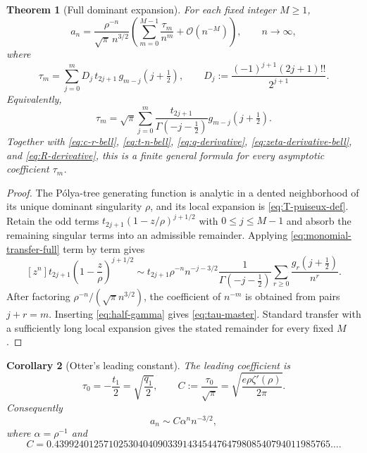 \documentclass[11pt,oneside]{article}
\numberwithin{equation}{section}
\theoremstyle{plain}
\newtheorem{theorem}{Theorem}[section]
\newtheorem{corollary}[theorem]{Corollary}
\theoremstyle{definition}
\theoremstyle{remark}
\newcommand{\Ord}{\mathcal O}
\begin{document}
\begin{theorem}[Full dominant expansion]\label{thm:dominant-expansion}
For each fixed integer $M\ge1$,
\begin{equation}\label{eq:dominant-expansion-M}
 a_n=\frac{\rho^{-n}}{\sqrt\pi\,n^{3/2}}
 \left(\sum_{m=0}^{M-1}\frac{\tau_m}{n^m}
       +\Ord(n^{-M})\right),\qquad n\to\infty,
\end{equation}
where
\begin{equation}\label{eq:tau-master}
 \boxed{
 \tau_m=\sum_{j=0}^{m}
 D_j\,t_{2j+1}\,g_{m-j}\!\left(j+\tfrac12\right),
 \qquad
 D_j:=\frac{(-1)^{j+1}(2j+1)!!}{2^{j+1}}.}
\end{equation}
Equivalently,
\begin{equation}\label{eq:tau-master-gamma}
 \tau_m=\sqrt\pi\sum_{j=0}^{m}
 \frac{t_{2j+1}}{\Gamma(-j-\tfrac12)}
 g_{m-j}\!\left(j+\tfrac12\right).
\end{equation}
Together with \eqref{eq:c-r-bell}, \eqref{eq:t-n-bell},
\eqref{eq:q-derivative}, \eqref{eq:zeta-derivative-bell}, and
\eqref{eq:R-derivative}, this is a finite general formula for every
asymptotic coefficient $\tau_m$.
\end{theorem}

\begin{proof}
The P\'olya-tree generating function is analytic in a dented neighborhood
of its unique dominant singularity $\rho$, and its local expansion is
\eqref{eq:T-puiseux-def}.  Retain the odd terms
$t_{2j+1}(1-z/\rho)^{j+1/2}$ with $0\le j\le M-1$ and absorb the remaining
singular terms into an admissible remainder.  Applying
\eqref{eq:monomial-transfer-full} term by term gives
\[
 [z^n]t_{2j+1}\left(1-\frac z\rho\right)^{j+1/2}
 \sim t_{2j+1}\rho^{-n}n^{-j-3/2}
 \frac1{\Gamma(-j-\tfrac12)}
 \sum_{r\ge0}\frac{g_r(j+\tfrac12)}{n^r}.
\]
After factoring $\rho^{-n}/(\sqrt\pi n^{3/2})$, the coefficient of $n^{-m}$
is obtained from pairs $j+r=m$.  Inserting \eqref{eq:half-gamma} gives
\eqref{eq:tau-master}.  Standard transfer with a sufficiently long local
expansion gives the stated remainder for every fixed $M$.
\end{proof}

\begin{corollary}[Otter's leading constant]\label{cor:otter-constant}
The leading coefficient is
\begin{equation}\label{eq:tau0-C}
 \tau_0=-\frac{t_1}{2}=\sqrt{\frac{q_1}{2}},\qquad
 C:=\frac{\tau_0}{\sqrt\pi}
 =\sqrt{\frac{e\rho\zeta'(\rho)}{2\pi}}.
\end{equation}
Consequently
\begin{equation}\label{eq:leading-otter}
 a_n\sim C\alpha^n n^{-3/2},
\end{equation}
where $\alpha=\rho^{-1}$ and
\begin{equation}\label{eq:C-numeric}
 C=0.43992401257102530404090339143454476479808540794011985765\ldots.
\end{equation}
\end{corollary}
\end{document}
